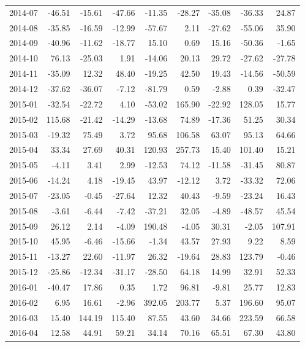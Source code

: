 \begin{table}[ht]
\begin{tabular}{lrrrrrrrr}
  2014-07 & -46.51 & -15.61 & -47.66 & -11.35 & -28.27 & -35.08 & -36.33 & 24.87 \\ 
  2014-08 & -35.85 & -16.59 & -12.99 & -57.67 & 2.11 & -27.62 & -55.06 & 35.90 \\ 
  2014-09 & -40.96 & -11.62 & -18.77 & 15.10 & 0.69 & 15.16 & -50.36 & -1.65 \\ 
  2014-10 & 76.13 & -25.03 & 1.91 & -14.06 & 20.13 & 29.72 & -27.62 & -27.78 \\ 
  2014-11 & -35.09 & 12.32 & 48.40 & -19.25 & 42.50 & 19.43 & -14.56 & -50.59 \\ 
  2014-12 & -37.62 & -36.07 & -7.12 & -81.79 & 0.59 & -2.88 & 0.39 & -32.47 \\ 
  2015-01 & -32.54 & -22.72 & 4.10 & -53.02 & 165.90 & -22.92 & 128.05 & 15.77 \\ 
  2015-02 & 115.68 & -21.42 & -14.29 & -13.68 & 74.89 & -17.36 & 51.25 & 30.34 \\ 
  2015-03 & -19.32 & 75.49 & 3.72 & 95.68 & 106.58 & 63.07 & 95.13 & 64.66 \\ 
  2015-04 & 33.34 & 27.69 & 40.31 & 120.93 & 257.73 & 15.40 & 101.40 & 15.21 \\ 
  2015-05 & -4.11 & 3.41 & 2.99 & -12.53 & 74.12 & -11.58 & -31.45 & 80.87 \\ 
  2015-06 & -14.24 & 4.18 & -19.45 & 43.97 & -12.12 & 3.72 & -33.32 & 72.06 \\ 
  2015-07 & -23.05 & -0.45 & -27.64 & 12.32 & 40.43 & -9.59 & -23.24 & 16.43 \\ 
  2015-08 & -3.61 & -6.44 & -7.42 & -37.21 & 32.05 & -4.89 & -48.57 & 45.54 \\ 
  2015-09 & 26.12 & 2.14 & -4.09 & 190.48 & -4.05 & 30.31 & -2.05 & 107.91 \\ 
  2015-10 & 45.95 & -6.46 & -15.66 & -1.34 & 43.57 & 27.93 & 9.22 & 8.59 \\ 
  2015-11 & -13.27 & 22.60 & -11.97 & 26.32 & -19.64 & 28.83 & 123.79 & -0.46 \\ 
  2015-12 & -25.86 & -12.34 & -31.17 & -28.50 & 64.18 & 14.99 & 32.91 & 52.33 \\ 
  2016-01 & -40.47 & 17.86 & 0.35 & 1.72 & 96.81 & -9.81 & 25.77 & 12.83 \\ 
  2016-02 & 6.95 & 16.61 & -2.96 & 392.05 & 203.77 & 5.37 & 196.60 & 95.07 \\ 
  2016-03 & 15.40 & 144.19 & 115.40 & 87.55 & 43.60 & 34.66 & 223.59 & 66.58 \\ 
  2016-04 & 12.58 & 44.91 & 59.21 & 34.14 & 70.16 & 65.51 & 67.30 & 43.80 \\ 

\end{tabular}
\end{table}
